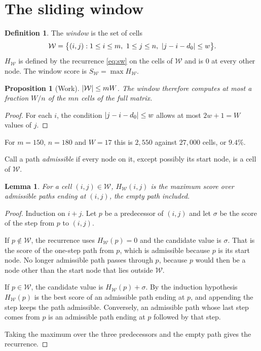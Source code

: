 \documentclass[11pt]{article}
\theoremstyle{plain}
\newtheorem{proposition}[theorem]{Proposition}
\newtheorem{lemma}[theorem]{Lemma}
\theoremstyle{definition}
\newtheorem*{definition}{Definition}
\theoremstyle{remark}
\DeclarePairedDelimiter{\abs}{\lvert}{\rvert}
\newcommand{\W}{\mathcal{W}}
\begin{document}
\section{The sliding window}

\begin{definition}
The \emph{window} is the set of cells
\[
\W = \bigl\{(i,j) : 1 \le i \le m,\ 1 \le j \le n,\ \abs{j - i - d_0} \le w \bigr\}.
\]
$H_{\W}$ is defined by the recurrence \eqref{eq:sw} on the cells of $\W$ and is
$0$ at every other node. The window score is $S_{\W} = \max H_{\W}$.
\end{definition}

\begin{proposition}[Work]\label{prop:work}
$\abs{\W} \le mW$. The window therefore computes at most a fraction $W/n$ of the
$mn$ cells of the full matrix.
\end{proposition}

\begin{proof}
For each $i$, the condition $\abs{j - i - d_0} \le w$ allows at most
$2w + 1 = W$ values of $j$.
\end{proof}

For $m = 150$, $n = 180$ and $W = 17$ this is $2{,}550$ against $27{,}000$
cells, or $9.4\%$.

Call a path \emph{admissible} if every node on it, except possibly its start
node, is a cell of $\W$.

\begin{lemma}\label{lem:window}
For a cell $(i,j) \in \W$, $H_{\W}(i,j)$ is the maximum score over admissible
paths ending at $(i,j)$, the empty path included.
\end{lemma}

\begin{proof}
Induction on $i + j$. Let $p$ be a predecessor of $(i,j)$ and let $\sigma$ be
the score of the step from $p$ to $(i,j)$.

If $p \notin \W$, the recurrence uses $H_{\W}(p) = 0$ and the candidate value is
$\sigma$. That is the score of the one-step path from $p$, which is admissible
because $p$ is its start node. No longer admissible path passes through $p$,
because $p$ would then be a node other than the start node that lies outside
$\W$.

If $p \in \W$, the candidate value is $H_{\W}(p) + \sigma$. By the induction
hypothesis $H_{\W}(p)$ is the best score of an admissible path ending at $p$,
and appending the step keeps the path admissible. Conversely, an admissible path
whose last step comes from $p$ is an admissible path ending at $p$ followed by
that step.

Taking the maximum over the three predecessors and the empty path gives the
recurrence.
\end{proof}
\end{document}
